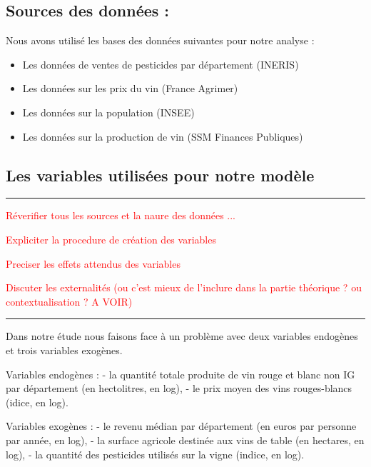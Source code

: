\documentclass[11pt,]{article}
\providecommand{\tightlist}{%
  \setlength{\itemsep}{0pt}\setlength{\parskip}{0pt}}
\begin{document}
\hypertarget{sources-des-donnees}{%
\subsection{Sources des données :}\label{sources-des-donnees}}

Nous avons utilisé les bases des données suivantes pour notre analyse :

\begin{itemize}
\tightlist
\item
  Les données de ventes de pesticides par département (INERIS)
\item
  Les données sur les prix du vin (France Agrimer)
\item
  Les données sur la population (INSEE)
\item
  Les données sur la production de vin (SSM Finances Publiques)
\end{itemize}

\hypertarget{les-variables-utilisees-pour-notre-modele}{%
\subsection{Les variables utilisées pour notre
modèle}\label{les-variables-utilisees-pour-notre-modele}}

\noindent

\rule[0.5ex]{\linewidth}{1pt}

\textcolor{red}{Réverifier tous les sources et la naure des données ...}

\textcolor{red}{Expliciter la procedure de création des variables}

\textcolor{red}{Preciser les effets attendus des variables}

\textcolor{red}{Discuter les externalités (ou c'est mieux de l'inclure dans la partie théorique ? ou contextualisation ? A VOIR)}

\noindent

\rule[0.5ex]{\linewidth}{1pt}

Dans notre étude nous faisons face à un problème avec deux variables
endogènes et trois variables exogènes.

Variables endogènes : - la quantité totale produite de vin rouge et
blanc non IG par département (en hectolitres, en log), - le prix moyen
des vins rouges-blancs (idice, en log).

Variables exogènes : - le revenu médian par département (en euros par
personne par année, en log), - la surface agricole destinée aux vins de
table (en hectares, en log), - la quantité des pesticides utilisés sur
la vigne (indice, en log).
\end{document}
